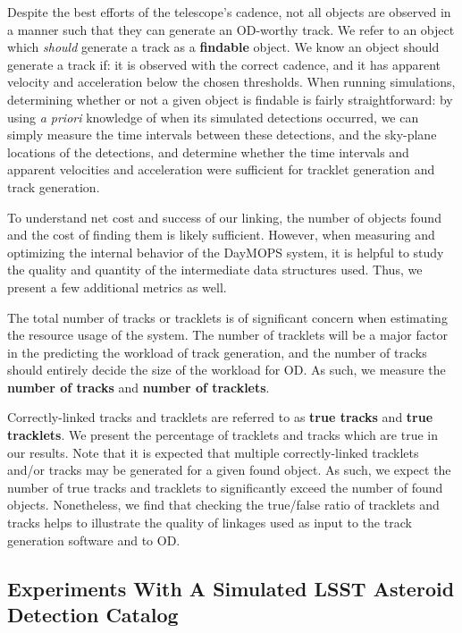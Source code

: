 Despite the best efforts of the telescope's cadence, not all objects
are observed in a manner such that they can generate an OD-worthy
track.  We refer to an object which \textit{should} generate a track
as a \textbf{findable} object.  We know an object should generate a
track if: it is observed with the correct cadence, and it has apparent
velocity and acceleration below the chosen thresholds.  When running
simulations, determining whether or not a given object is findable is
fairly straightforward: by using \textit{a priori} knowledge of when
its simulated detections occurred, we can simply measure the time
intervals between these detections, and the sky-plane locations of the
detections, and determine whether the time intervals and apparent
velocities and acceleration were sufficient for tracklet generation
and track generation.  


To understand net cost and success of our linking, the number of
objects found and the cost of finding them is likely sufficient.
However, when measuring and optimizing the internal behavior of the
DayMOPS system, it is helpful to study the quality and quantity of the
intermediate data structures used. Thus, we present a few additional
metrics as well.

The total number of tracks or tracklets is of significant concern when
estimating the resource usage of the system.  The number of tracklets
will be a major factor in the predicting the workload of track
generation, and the number of tracks should entirely decide the size
of the workload for OD.  As such, we measure the \textbf{number of
  tracks} and \textbf{number of tracklets}.  

Correctly-linked tracks and tracklets are referred to as \textbf{true
  tracks} and \textbf{true tracklets}. We present the percentage of
tracklets and tracks which are true in our results. Note that it is
expected that multiple correctly-linked tracklets and/or tracks may be
generated for a given found object. As such, we expect the number of
true tracks and tracklets to significantly exceed the number of found
objects.  Nonetheless, we find that checking the true/false ratio of
tracklets and tracks helps to illustrate the quality of linkages used
as input to the track generation software and to OD.





\subsection{Experiments With A Simulated LSST Asteroid Detection Catalog}

